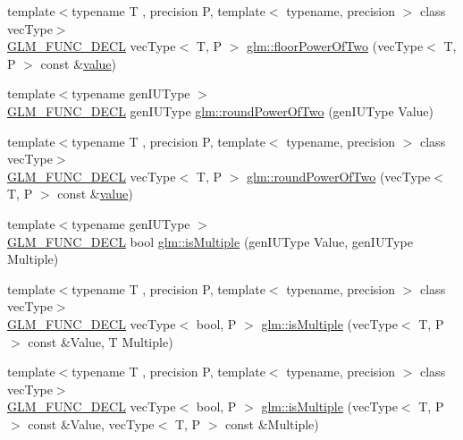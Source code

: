 \begin{DoxyCompactItemize}
\item 
{\footnotesize template$<$typename T , precision P, template$<$ typename, precision $>$ class vec\+Type$>$ }\\\mbox{\hyperlink{setup_8hpp_ab2d052de21a70539923e9bcbf6e83a51}{G\+L\+M\+\_\+\+F\+U\+N\+C\+\_\+\+D\+E\+CL}} vec\+Type$<$ T, P $>$ \mbox{\hyperlink{group__gtc__round_ga6a5a8f6dd1b2f755e4572bd039062c37}{glm\+::floor\+Power\+Of\+Two}} (vec\+Type$<$ T, P $>$ const \&\mbox{\hyperlink{glad_8h_a03aff08f73d7fde3d1a08e0abd8e84fa}{value}})
\item 
{\footnotesize template$<$typename gen\+I\+U\+Type $>$ }\\\mbox{\hyperlink{setup_8hpp_ab2d052de21a70539923e9bcbf6e83a51}{G\+L\+M\+\_\+\+F\+U\+N\+C\+\_\+\+D\+E\+CL}} gen\+I\+U\+Type \mbox{\hyperlink{group__gtc__round_ga6d24a9e3abe3e6a908661b43acb8efe0}{glm\+::round\+Power\+Of\+Two}} (gen\+I\+U\+Type Value)
\item 
{\footnotesize template$<$typename T , precision P, template$<$ typename, precision $>$ class vec\+Type$>$ }\\\mbox{\hyperlink{setup_8hpp_ab2d052de21a70539923e9bcbf6e83a51}{G\+L\+M\+\_\+\+F\+U\+N\+C\+\_\+\+D\+E\+CL}} vec\+Type$<$ T, P $>$ \mbox{\hyperlink{group__gtc__round_gae95be3b384f3bbd00c6c1cf0a1f96485}{glm\+::round\+Power\+Of\+Two}} (vec\+Type$<$ T, P $>$ const \&\mbox{\hyperlink{glad_8h_a03aff08f73d7fde3d1a08e0abd8e84fa}{value}})
\item 
{\footnotesize template$<$typename gen\+I\+U\+Type $>$ }\\\mbox{\hyperlink{setup_8hpp_ab2d052de21a70539923e9bcbf6e83a51}{G\+L\+M\+\_\+\+F\+U\+N\+C\+\_\+\+D\+E\+CL}} bool \mbox{\hyperlink{group__gtc__round_gaf7444a7b2eb524f373463ceba76b9326}{glm\+::is\+Multiple}} (gen\+I\+U\+Type Value, gen\+I\+U\+Type Multiple)
\item 
{\footnotesize template$<$typename T , precision P, template$<$ typename, precision $>$ class vec\+Type$>$ }\\\mbox{\hyperlink{setup_8hpp_ab2d052de21a70539923e9bcbf6e83a51}{G\+L\+M\+\_\+\+F\+U\+N\+C\+\_\+\+D\+E\+CL}} vec\+Type$<$ bool, P $>$ \mbox{\hyperlink{group__gtc__round_ga50ea5d5dc33fffba39ad6002a3784123}{glm\+::is\+Multiple}} (vec\+Type$<$ T, P $>$ const \&Value, T Multiple)
\item 
{\footnotesize template$<$typename T , precision P, template$<$ typename, precision $>$ class vec\+Type$>$ }\\\mbox{\hyperlink{setup_8hpp_ab2d052de21a70539923e9bcbf6e83a51}{G\+L\+M\+\_\+\+F\+U\+N\+C\+\_\+\+D\+E\+CL}} vec\+Type$<$ bool, P $>$ \mbox{\hyperlink{group__gtc__round_ga7ae705574ef3e3ebfb4f537d8d285c48}{glm\+::is\+Multiple}} (vec\+Type$<$ T, P $>$ const \&Value, vec\+Type$<$ T, P $>$ const \&Multiple)

\end{DoxyCompactItemize}
